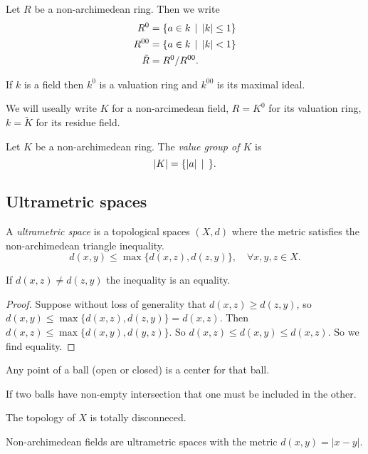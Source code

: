\begin{definition}
	Let $R$ be a non-archimedean ring. Then we write 
	\begin{align*}
		R^{0} &= \{a \in k \st |k| \le 1\}  \\
		R^{00} &=  \{a \in k \st |k| < 1\}  \\
		\tilde R &= R^{0} / R^{00}
	.\end{align*}
\end{definition}
If $k$ is a field then $k^{0}$ is a valuation ring and $ k^{00}$ is its maximal ideal. 

We will useally write $K$ for a non-arcimedean field, $R = K^{0}$ for its valuation ring, $k = \tilde K$ for its residue field. 

\begin{definition}
	Let $K$ be a non-archimedean ring. 
	The \emph{value group of $K$} is \[
	|K| = \{|a| \st \} 
	.\] 
\end{definition}


\subsection{Ultrametric spaces} \label{sec:ultrametric_spaces}

\begin{definition}
	A \emph{ultrametric space} is a topological spaces $(X, d)$ where the metric satisfies the non-archimedean triangle inequality. 
	\[
		d(x, y) \le \max \{d(x, z) ,d(z, y)\}, \quad \forall x, y ,z \in X
	.\] 
\end{definition}
\begin{exercise}
	If $d(x,z) \ne d(z,y)$ the inequality is an equality. 
\end{exercise}
\begin{proof}
	Suppose without loss of generality that $d(x, z) \ge d(z,y)$, so $d(x, y) \le \max \{d(x, z), d(z,y)\} = d(x, z) $. 
	Then $d(x, z) \le \max \{d(x, y), d(y,z)\}$. So $d(x, z) \le d(x, y) \le d(x, z)$. So we find equality.
\end{proof}
\begin{corollary}
	Any point of a ball (open or closed) is a center for that ball. 
\end{corollary}
\begin{corollary}
	If two balls have non-empty intersection that one must be included in the other. 
\end{corollary}
\begin{corollary}
	The topology of $X$ is totally disconneced. 
\end{corollary}

Non-archimedean fields are ultrametric spaces with the metric $d(x, y) = |x - y|$. 

